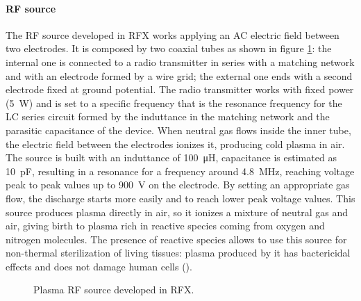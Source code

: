 \paragraph{RF source}
The RF source developed in RFX works applying an AC electric field between two electrodes. It is composed by two coaxial tubes as shown in figure \ref{fig:RF}: the internal one is connected to a radio transmitter in series with a matching network and with an electrode formed by a wire grid; the external one ends with a second electrode fixed at ground potential. The radio transmitter works with fixed power (\SI{5}{\watt}) and is set to a specific frequency that is the resonance frequency for the LC series circuit formed by the induttance in the matching network and the parasitic capacitance of the device. When neutral gas flows inside the inner tube, the electric field between the electrodes ionizes it, producing cold plasma in air. The source is built with an induttance of \SI{100}{\micro\henry}, capacitance is estimated as \SI{10}{\pico\farad}, resulting in a resonance for a frequency around \SI{4.8}{\mega\hertz}, reaching voltage peak to peak values up to \SI{900}{\volt} on the electrode. By setting an appropriate gas flow, the discharge starts more easily and to reach lower peak voltage values.
This source produces plasma directly in air, so it ionizes a mixture of neutral gas and air, giving birth to plasma rich in reactive species coming from oxygen and nitrogen molecules. The presence of reactive species allows to use this source for non-thermal sterilization of living tissues: plasma produced by it has bactericidal effects and does not damage human cells (\cite{doi:10.1002/ppap.200700154}).
\begin{figure}
 \centering
 \hfill
 \caption{Plasma RF source developed in RFX.}
 \label{fig:RF}
\end{figure}


